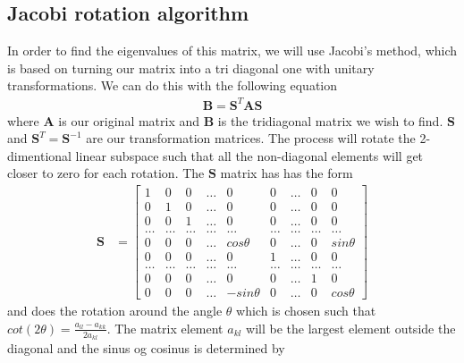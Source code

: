 \documentclass[12pt]{article}
\begin{document}
\subsection*{Jacobi rotation algorithm}
In order to find the eigenvalues of this matrix, we will use Jacobi's method, which is based on turning our matrix into a tri diagonal one with unitary transformations. We can do this with the following equation 
\begin{align*}
    \textbf{B} = \textbf{S}^T\textbf{AS}
\end{align*}
where $\textbf{A}$ is our original matrix and $\textbf{B}$ is the tridiagonal matrix we wish to find. $\textbf{S}$ and $\textbf{S}^T=\textbf{S}^{-1}$ are our transformation matrices. The process will rotate the 2-dimentional linear subspace such that all the non-diagonal elements will get closer to zero for each rotation.
The $\textbf{S}$ matrix has has the form
\begin{align*}
    \textbf{S} &=
    \begin{bmatrix}
        1     & 0     & 0     & \dots  & 0 & 0 & \dots & 0 & 0\\
        0     & 1     & 0     & \dots  & 0 & 0 & \dots & 0 & 0\\
        0     & 0     & 1     & \dots  & 0 & 0 & \dots & 0 & 0\\
        \dots & \dots & \dots & \dots & \dots & \dots & \dots& \dots & \dots\\
        0 & 0 & 0 & \dots & cos\theta & 0 & \dots& 0 & sin\theta\\
        0     & 0 & 0 & \dots & 0 & 1 &\dots & 0 & 0\\
        \dots & \dots & \dots & \dots & \dots & \dots & \dots& \dots & \dots\\
        0     & 0 & 0 & \dots  & 0 & 0 & \dots & 1 & 0\\
        0     & 0 & 0 & \dots  & -sin\theta & 0 & \dots &  0 & cos\theta
    \end{bmatrix}
\end {align*}
and does the rotation around the angle $\theta$ which is chosen such that $cot(2\theta) = \frac{a_{ll}-a_{kk}}{2a_{kl}}$. The matrix element $a_{kl}$ will be the largest element outside the diagonal and the sinus og cosinus is determined by  
\end{document}
